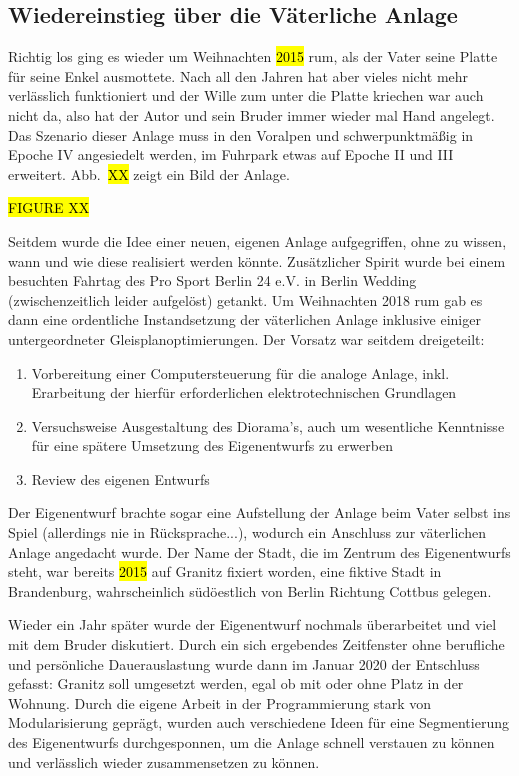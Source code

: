 \subsection{Wiedereinstieg \"uber die V\"aterliche Anlage}
\label{sec:theReturn}

Richtig los ging es wieder um Weihnachten \hl{2015} rum, als der Vater seine Platte f\"ur seine Enkel ausmottete.
Nach all den Jahren hat aber vieles nicht mehr verl\"asslich funktioniert und der Wille zum unter die Platte kriechen war auch nicht da, also hat der Autor und sein Bruder immer wieder mal Hand angelegt.
Das Szenario dieser Anlage muss in den Voralpen und schwerpunktm\"a{\ss}ig in Epoche IV angesiedelt werden, im Fuhrpark etwas auf Epoche II und III erweitert.
Abb.~\hl{XX} zeigt ein Bild der Anlage.

\hl{FIGURE XX}

Seitdem wurde die Idee einer neuen, eigenen Anlage aufgegriffen, ohne zu wissen, wann und wie diese realisiert werden k\"onnte.
Zus\"atzlicher Spirit wurde bei einem besuchten Fahrtag des Pro Sport Berlin 24 e.V. in Berlin Wedding (zwischenzeitlich leider aufgel\"ost) getankt.
Um Weihnachten 2018 rum gab es dann eine ordentliche Instandsetzung der v\"aterlichen Anlage inklusive einiger untergeordneter Gleisplanoptimierungen.
Der Vorsatz war seitdem dreigeteilt:
\begin{enumerate}
	\item Vorbereitung einer Computersteuerung f\"ur die analoge Anlage, inkl. Erarbeitung der hierf\"ur erforderlichen elektrotechnischen Grundlagen
	\item Versuchsweise Ausgestaltung des Diorama's, auch um wesentliche Kenntnisse f\"ur eine sp\"atere Umsetzung des Eigenentwurfs zu erwerben
	\item Review des eigenen Entwurfs
\end{enumerate}
Der Eigenentwurf brachte sogar eine Aufstellung der Anlage beim Vater selbst ins Spiel (allerdings nie in R\"ucksprache...), wodurch ein Anschluss zur v\"aterlichen Anlage angedacht wurde.
Der Name der Stadt, die im Zentrum des Eigenentwurfs steht, war bereits \hl{2015} auf Granitz fixiert worden, eine fiktive Stadt in Brandenburg, wahrscheinlich s\"ud\"oestlich von Berlin Richtung Cottbus gelegen.

Wieder ein Jahr sp\"ater wurde der Eigenentwurf nochmals \"uberarbeitet und viel mit dem Bruder diskutiert.
Durch ein sich ergebendes Zeitfenster ohne berufliche und pers\"onliche Dauerauslastung wurde dann im Januar 2020 der Entschluss gefasst:
Granitz soll umgesetzt werden, egal ob mit oder ohne Platz in der Wohnung.
Durch die eigene Arbeit in der Programmierung stark von Modularisierung gepr\"agt, wurden auch verschiedene Ideen f\"ur eine Segmentierung des Eigenentwurfs durchgesponnen, um die Anlage schnell verstauen zu k\"onnen und verl\"asslich wieder zusammensetzen zu k\"onnen.

